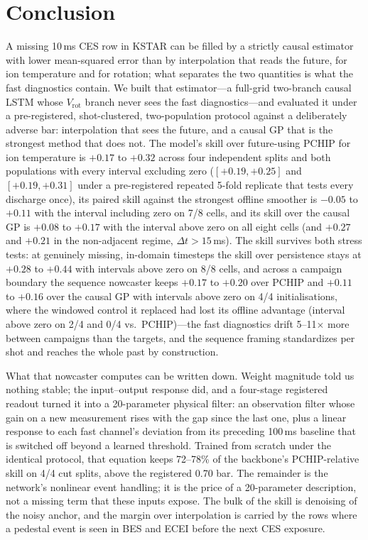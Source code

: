 \documentclass[10pt]{article}
\newcommand{\Vrot}{\ensuremath{V_\mathrm{rot}}}
\begin{document}
\section{Conclusion}
\label{sec:conclusion}

A missing 10\,ms CES row in KSTAR can be filled by a strictly causal estimator with
lower mean-squared error than by interpolation that reads the future, for ion
temperature and for rotation; what separates the two quantities is what the fast
diagnostics contain. We built that estimator---a full-grid two-branch causal LSTM whose \Vrot{}
branch never sees the fast diagnostics---and evaluated it under a pre-registered,
shot-clustered, two-population protocol against a deliberately adverse bar:
interpolation that sees the future, and a causal GP that is the strongest method that
does not. The model's skill over future-using PCHIP for ion temperature is $+0.17$ to
$+0.32$ across four independent splits and both populations with every interval
excluding zero ($[+0.19, +0.25]$ and $[+0.19, +0.31]$ under a pre-registered repeated
5-fold replicate that tests every discharge once), its paired skill against the
strongest offline smoother is $-0.05$ to $+0.11$ with the interval including zero on
7/8 cells, and its skill over the causal GP is $+0.08$ to $+0.17$ with the interval
above zero on all eight cells (and $+0.27$ and $+0.21$ in the non-adjacent regime,
$\Delta t > 15$\,ms). The skill survives both stress tests: at genuinely missing,
in-domain timesteps the skill over persistence stays at $+0.28$ to $+0.44$ with
intervals above zero on 8/8 cells, and across a campaign boundary the sequence
nowcaster keeps $+0.17$ to $+0.20$ over PCHIP and $+0.11$ to $+0.16$ over the causal
GP with intervals above zero on 4/4 initialisations, where the windowed control it
replaced had lost its offline advantage (interval above zero on 2/4 and 0/4 vs.\
PCHIP)---the fast diagnostics drift 5--11$\times$ more between campaigns than the
targets, and the sequence framing standardizes per shot and reaches the whole past
by construction.

What that nowcaster computes can be written down. Weight magnitude told us nothing
stable; the input--output response did, and a four-stage registered readout turned it
into a 20-parameter physical filter: an observation filter whose gain on a new
measurement rises with the gap since the last one, plus a linear response to each
fast channel's deviation from its preceding 100\,ms baseline that is switched off
beyond a learned threshold. Trained from scratch under the identical protocol, that
equation keeps 72--78\% of the backbone's PCHIP-relative skill on 4/4 cut splits,
above the registered 0.70 bar. The remainder is the network's nonlinear event
handling; it is the price of a 20-parameter description, not a missing term that
these inputs expose. The bulk of the skill is denoising of the noisy anchor, and the
margin over interpolation is carried by the rows where a pedestal event is seen in
BES and ECEI before the next CES exposure.
\end{document}
